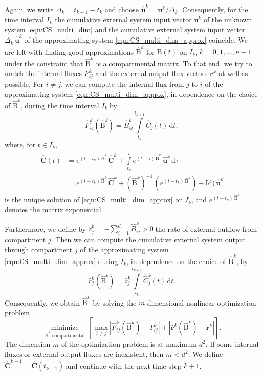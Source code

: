 \documentclass[11pt,a4paper]{article}
\renewcommand{\vec}[1]{\mathbf{#1}}
\newcommand{\tens}[1]{\mathrm{#1}}
\newcommand{\id}{\tens{Id}}
\newcommand{\dd}[1]{\,\mathrm{d}#1}
\newcommand{\intl}{\int\limits}
\begin{document}
        Again, we write $\Delta_k=t_{k+1}-t_k$ and choose $\widehat{\vec{u}}^k=\vec{u}^k/\Delta_k$.
        Consequently, for the time interval $I_k$ the cumulative external system input vector $\vec{u}^k$ of the unknown system \eqref{eqn:CS_multi_dim} and the cumulative external system input vector $\Delta_k\,\widehat{\vec{u}}^k$ of the approximating system \eqref{eqn:CS_multi_dim_approx} coincide.
        We are left with finding good approximations $\widehat{\tens{B}}^k$ for $\tens{B}(t)$ on $I_k$, $k=0,1,\ldots,n-1$ under the constraint that $\widehat{\tens{B}}^k$ is a compartmental matrix.
        To that end, we try to match the internal fluxes $F^k_{ij}$ and the external output flux vectors $\vec{r}^k$ at well as possible.
        For $i\neq j$, we can compute the internal flux from $j$ to $i$ of the approximating system \eqref{eqn:CS_multi_dim_approx}, in dependence on the choice of $\widehat{\tens{B}}^k$, during the time interval $I_k$ by
        \begin{equation*}
            \widehat{F}^k_{ij}(\widehat{\tens{B}}^k) = \widehat{B}^k_{ij}\intl_{t_k}^{t_{k+1}} \widehat{C}_j(t)\dd{t},
        \end{equation*}
        where, for $t\in I_k$,
        \begin{align*}
            \widehat{\vec{C}}(t) &= e^{(t-t_k)\,\widehat{\tens{B}}^k}\,\widehat{\vec{C}}^k + \intl_{t_k}^t e^{(t-\tau)\,\widehat{\tens{B}}^k}\,\widehat{\vec{u}}^k\dd{\tau}\\
            &= e^{(t-t_k)\,\widehat{\tens{B}}^k}\,\widehat{\vec{C}}^k + (\widehat{\tens{B}}^k)^{-1}\,(e^{(t-t_k)\,\widehat{\tens{B}}^k})-\id)\,\widehat{\vec{u}}^k
        \end{align*}
        is the unique solution of \eqref{eqn:CS_multi_dim_approx} on $I_k$, and $e^{(t-t_k)\,\widehat{\tens{B}}^k}$ denotes the matrix exponential.

        Furthermore, we define by $\widehat{z}^k_j=-\sum_{i=1}^d \widehat{B}^k_{ij}>0$ the rate of external outflow from compartment $j$.
        Then we can compute the cumulative external system output through compartment $j$ of the approximating system \eqref{eqn:CS_multi_dim_approx} during $I_k$, in dependence on the choice of $\widehat{\tens{B}}^k$, by
        \begin{equation*}
            \widehat{r}^k_j(\widehat{\tens{B}}^k) = \widehat{z}^k_j\intl_{t_k}^{t_{k+1}} \widehat{C}^k_j(t)\dd{t}.
        \end{equation*}
        Consequently, we obtain $\widehat{\tens{B}}^k$ by solving the $m$-dimensional nonlinear optimization problem
        \begin{equation*}
            \underset{\widehat{\tens{B}}^k\text{ compartmental}}{\operatorname{minimize}}\,\left[\max\limits_{i\neq j} |\widehat{F}^k_{ij}(\widehat{\tens{B}}^k)-F^k_{ij}| + |\widehat{\vec{r}}^k(\widehat{\tens{B}}^k)-\vec{r}^k|\right].
        \end{equation*}
        The dimension $m$ of the optimization problem is at maximum $d^2$.
        If some internal fluxes or external output fluxes are inexistent, then $m<d^2$.
        We define $\widehat{\vec{C}}^{k+1}=\widehat{\vec{C}}(t_{k+1})$ and continue with the next time step $k+1$.\\
       
\end{document}
